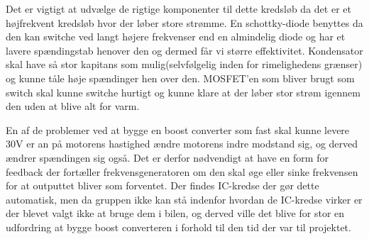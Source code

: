 Det er vigtigt at udvælge de rigtige komponenter til dette kredsløb da det er et højfrekvent kredsløb hvor der løber store strømme. En schottky-diode benyttes da den kan switche ved langt højere frekvenser end en almindelig diode og har et lavere spændingstab henover den og dermed får vi større effektivitet. Kondensator skal have så stor kapitans som mulig(selvfølgelig inden for rimelighedens grænser) og kunne tåle høje spændinger hen over den. MOSFET'en som bliver brugt som switch skal kunne switche hurtigt og kunne klare at der løber stor strøm igennem den uden at blive alt for varm.

En af de problemer ved at bygge en boost converter som fast skal kunne levere 30V er an på motorens hastighed ændre motorens indre modstand sig, og derved ændrer spændingen sig også. Det er derfor nødvendigt at have en form for feedback der fortæller frekvensgeneratoren om den skal øge eller sinke frekvensen for at outputtet bliver som forventet. Der findes IC-kredse der gør dette automatisk, men da gruppen ikke kan stå indenfor hvordan de IC-kredse virker er der blevet valgt ikke at bruge dem i  bilen, og derved ville det blive for stor en udfordring at bygge boost converteren i forhold til den tid der var til projektet.
